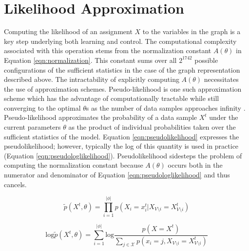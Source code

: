 \documentclass{article} %
\begin{document}
\section{Likelihood Approximation}
Computing the likelihood of an assignment $X$ to the variables in the graph is a key step underlying both learning and control. The computational complexity associated with this operation stems from the normalization constant $A(\theta)$ in Equation \ref{eqn:normalization}. This constant sums over all $2^{1742}$ possible configurations of the sufficient statistics in the case of the graph representation described above. The intractability of explicitly computing $A(\theta)$ necessitates the use of approximation schemes. Pseudo-likelihood is one such approximation scheme which has the advantage of computationally tractable while still converging to the optimal $\theta$s as the number of data samples approaches infinity \cite{besag75}. Pseudo-likelihood approximates the probability of a data sample $X^t$ under the current parameters $\theta$ as the product of individual probabilities taken over the sufficient statistics of the model. Equation \ref{eqn:pseudolikelihood} expresses the pseudolikelihood; however, typically the log of this quantity is used in practice (Equation \ref{eqn:pseudologlikelihood}). Pseudolikelihood sidesteps the problem of computing the normalization constant because $A(\theta)$ occurs both in the numerator and denominator of Equation \ref{eqn:pseudologlikelihood} and thus cancels.

\begin{equation}
\tilde{p}(X^t,\theta) = \prod_{i=1}^{|\phi|} p(X_i = x_i^t | X_{V\setminus i} = X_{V\setminus i}^t) 
\label{eqn:pseudolikelihood}
\end{equation}

\begin{equation}
\textrm{log}\tilde{p}(X^t,\theta) = \sum_{i=1}^{|\phi|} \textrm{log}\frac{p(X = X^t)}{\sum_{j \in \mathcal{X}} p(x_i = j, X_{V\setminus i} = X_{V\setminus i}^t)}
\label{eqn:pseudologlikelihood}
\end{equation}

\end{document}
